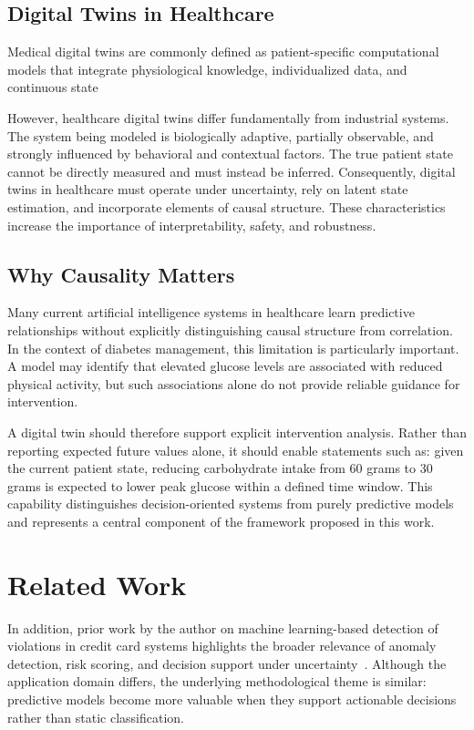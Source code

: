 \documentclass[journal]{IEEEtran}
\begin{document}
\subsection{Digital Twins in Healthcare}
Medical digital twins are commonly defined as patient-specific computational models that integrate physiological knowledge, individualized data, and continuous state 

However, healthcare digital twins differ fundamentally from industrial systems. The system being modeled is biologically adaptive, partially observable, and strongly influenced by behavioral and contextual factors. The true patient state cannot be directly measured and must instead be inferred. Consequently, digital twins in healthcare must operate under uncertainty, rely on latent state estimation, and incorporate elements of causal structure. These characteristics increase the importance of interpretability, safety, and robustness.

\subsection{Why Causality Matters}
Many current artificial intelligence systems in healthcare learn predictive relationships without explicitly distinguishing causal structure from correlation. In the context of diabetes management, this limitation is particularly important. A model may identify that elevated glucose levels are associated with reduced physical activity, but such associations alone do not provide reliable guidance for intervention.

A digital twin should therefore support explicit intervention analysis. Rather than reporting expected future values alone, it should enable statements such as: given the current patient state, reducing carbohydrate intake from 60 grams to 30 grams is expected to lower peak glucose within a defined time window. This capability distinguishes decision-oriented systems from purely predictive models and represents a central component of the framework proposed in this work.

\section{Related Work}

In addition, prior work by the author on machine learning-based detection of violations in credit card systems highlights the broader relevance of anomaly detection, risk scoring, and decision support under uncertainty~\cite{ref15}. Although the application domain differs, the underlying methodological theme is similar: predictive models become more valuable when they support actionable decisions rather than static classification.
\end{document}
